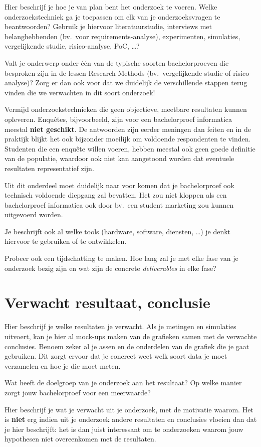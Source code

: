 Hier beschrijf je hoe je van plan bent het onderzoek te voeren. Welke onderzoekstechniek ga je toepassen om elk van je onderzoeksvragen te beantwoorden? Gebruik je hiervoor literatuurstudie, interviews met belanghebbenden (bv.~voor requirements-analyse), experimenten, simulaties, vergelijkende studie, risico-analyse, PoC, \ldots?

Valt je onderwerp onder één van de typische soorten bachelorproeven die besproken zijn in de lessen Research Methods (bv.\ vergelijkende studie of risico-analyse)? Zorg er dan ook voor dat we duidelijk de verschillende stappen terug vinden die we verwachten in dit soort onderzoek!

Vermijd onderzoekstechnieken die geen objectieve, meetbare resultaten kunnen opleveren. Enquêtes, bijvoorbeeld, zijn voor een bachelorproef informatica meestal \textbf{niet geschikt}. De antwoorden zijn eerder meningen dan feiten en in de praktijk blijkt het ook bijzonder moeilijk om voldoende respondenten te vinden. Studenten die een enquête willen voeren, hebben meestal ook geen goede definitie van de populatie, waardoor ook niet kan aangetoond worden dat eventuele resultaten representatief zijn.

Uit dit onderdeel moet duidelijk naar voor komen dat je bachelorproef ook technisch voldoen\-de diepgang zal bevatten. Het zou niet kloppen als een bachelorproef informatica ook door bv.\ een student marketing zou kunnen uitgevoerd worden.

Je beschrijft ook al welke tools (hardware, software, diensten, \ldots) je denkt hiervoor te gebruiken of te ontwikkelen.

Probeer ook een tijdschatting te maken. Hoe lang zal je met elke fase van je onderzoek bezig zijn en wat zijn de concrete \emph{deliverables} in elke fase?

\section{Verwacht resultaat, conclusie}%
\label{sec:verwachte_resultaten}

Hier beschrijf je welke resultaten je verwacht. Als je metingen en simulaties uitvoert, kan je hier al mock-ups maken van de grafieken samen met de verwachte conclusies. Benoem zeker al je assen en de onderdelen van de grafiek die je gaat gebruiken. Dit zorgt ervoor dat je concreet weet welk soort data je moet verzamelen en hoe je die moet meten.

Wat heeft de doelgroep van je onderzoek aan het resultaat? Op welke manier zorgt jouw bachelorproef voor een meerwaarde?

Hier beschrijf je wat je verwacht uit je onderzoek, met de motivatie waarom. Het is \textbf{niet} erg indien uit je onderzoek andere resultaten en conclusies vloeien dan dat je hier beschrijft: het is dan juist interessant om te onderzoeken waarom jouw hypothesen niet overeenkomen met de resultaten.

